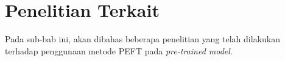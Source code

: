 \section{Penelitian Terkait}

Pada sub-bab ini, akan dibahas beberapa penelitian yang telah dilakukan terhadap penggunaan metode PEFT pada \textit{pre-trained model}.
